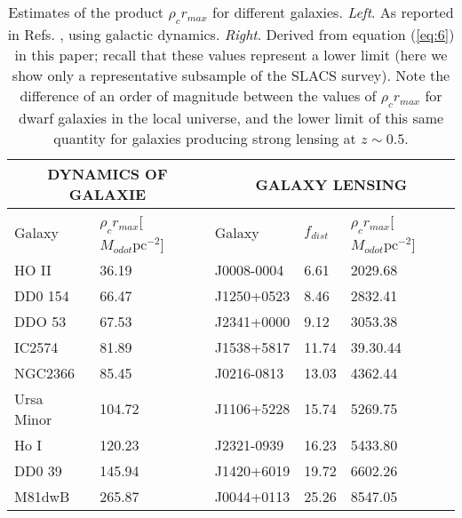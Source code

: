 \documentclass[10pt,twoside,twocolumn]{article}
\begin{document}
  \begin{table*}[t]
  \centering
        \begin{tabular}{ |p{2cm}|p{3cm}|p{2cm}|p{1cm}|p{3cm}|}
         \hline
         \multicolumn{2}{|c|}{\textbf{DYNAMICS OF GALAXIE}} 
         &\multicolumn{3}{|c|}{\textbf{GALAXY LENSING}} \\
         \hline
         Galaxy & $\rho_cr_{max}$[$M_{odot}\text{pc}^{-2}$] & Galaxy & $f_{dist}$ & $\rho_cr_{max}$[$M_{odot}\text{pc}^{-2}$] \\ 
         \hline
         HO II   & 36.19 & J0008-0004 & 6.61 & 2029.68\\
         \hline
         DD0 154 & 66.47 & J1250+0523 & 8.46 & 2832.41\\
          \hline
         DDO 53 & 67.53 & J2341+0000 & 9.12 & 3053.38\\
          \hline
         IC2574 & 81.89 & J1538+5817 & 11.74 & 39.30.44\\
          \hline
         NGC2366 & 85.45 & J0216-0813 & 13.03 & 4362.44\\
          \hline
         Ursa Minor & 104.72 & J1106+5228 & 15.74 & 5269.75\\
          \hline
         Ho I &120.23 & J2321-0939 & 16.23 & 5433.80\\
         \hline
         DD0 39 & 145.94 & J1420+6019 & 19.72 & 6602.26\\
         \hline
         M81dwB & 265.87 & J0044+0113 & 25.26 & 8547.05\\
         \hline
         \end{tabular}
                  \vspace{1em}
         \caption{Estimates of the product $\rho_{c}r_{max}$ for different galaxies. \textit{Left}. As reported in Refs. \cite{7}, using galactic dynamics. \textit{Right}. Derived from equation (\ref{eq:6}) in this paper; recall that these values represent a lower limit (here we show only a representative subsample of the SLACS survey). Note the difference of an order of magnitude between the values of $\rho_{c}r_{max}$ for dwarf galaxies in the local universe, and the lower limit of this same quantity for galaxies producing strong lensing at $z\sim 0.5$.}
        \label{tab:1}
    \end{table*}
\end{document}

